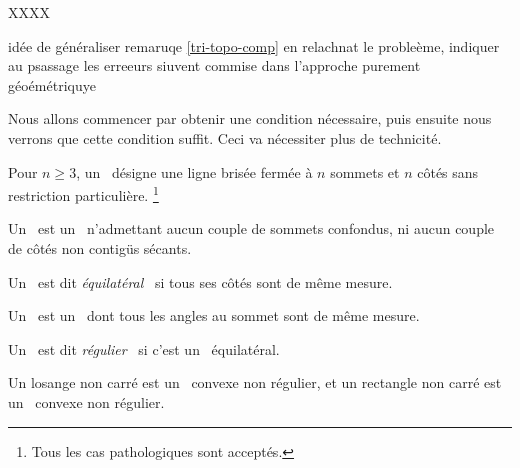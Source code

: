 XXXX


idée de généraliser remaruqe \ref{tri-topo-comp} en relachnat le probleème, indiquer au psassage les erreeurs siuvent commise dans l'approche purement géoémétriquye

Nous allons commencer par obtenir une condition nécessaire, puis ensuite nous verrons que cette condition suffit.
Ceci va nécessiter plus de technicité.




\begin{defi}
	Pour $n \geq 3$, un \og \emph{\ncycle} \fg\ désigne une ligne brisée fermée à $n$ sommets et $n$ côtés sans restriction particulière.%
	\footnote{
		Tous les cas pathologiques sont acceptés.
	}
\end{defi}


\begin{defi}
	Un \og \emph{\ngone} \fg\ est un \ncycle\ n'admettant aucun couple de sommets confondus, ni aucun couple de côtés non contigüs sécants.
\end{defi}


\begin{defi}
	Un \ngone\ est dit \og \emph{équilatéral} \fg\ si tous ses côtés sont de même mesure.
\end{defi}


\begin{defi}
	Un \og \emph{\niso} \fg\ est un \ngone\ dont tous les angles au sommet sont de même mesure.
\end{defi}


\begin{defi}
	Un \ngone\ est dit \og \emph{régulier} \fg\ si c'est un \niso\ équilatéral.
\end{defi}


\begin{remark}
	Un losange non carré est un \nequi\ convexe non régulier, et un rectangle non carré est un \niso\ convexe non régulier.
\end{remark}
